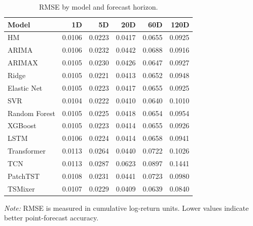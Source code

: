 \documentclass[runningheads,orivec]{llncs}
\begin{document}
\begin{table}[htbp]
\centering
\caption{RMSE by model and forecast horizon.}\label{tab:rmse_main}
\setlength{\tabcolsep}{4.5pt}
\begin{tabular}{lrrrrr}
\hline
Model & 1D & 5D & 20D & 60D & 120D \\
\hline
HM & 0.0106 & 0.0223 & 0.0417 & 0.0655 & 0.0925 \\
ARIMA & 0.0106 & 0.0232 & 0.0442 & 0.0688 & 0.0916 \\
ARIMAX & 0.0105 & 0.0230 & 0.0426 & 0.0647 & 0.0927 \\
Ridge & 0.0105 & 0.0221 & 0.0413 & 0.0652 & 0.0948 \\
Elastic Net & 0.0105 & 0.0223 & 0.0417 & 0.0655 & 0.0925 \\
SVR & 0.0104 & 0.0222 & 0.0410 & 0.0640 & 0.1010 \\
Random Forest & 0.0105 & 0.0225 & 0.0418 & 0.0654 & 0.0954 \\
XGBoost & 0.0105 & 0.0223 & 0.0414 & 0.0655 & 0.0926 \\
LSTM & 0.0106 & 0.0224 & 0.0414 & 0.0658 & 0.0941 \\
Transformer & 0.0113 & 0.0264 & 0.0440 & 0.0722 & 0.1026 \\
TCN & 0.0113 & 0.0287 & 0.0623 & 0.0897 & 0.1441 \\
PatchTST & 0.0108 & 0.0231 & 0.0441 & 0.0723 & 0.0980 \\
TSMixer & 0.0107 & 0.0229 & 0.0409 & 0.0639 & 0.0840 \\
\hline
\end{tabular}
\par\vspace{4pt}\parbox{0.85\linewidth}{\footnotesize\textit{Note:} RMSE is measured in cumulative log-return units. Lower values indicate better point-forecast accuracy.}
\end{table}
\end{document}
